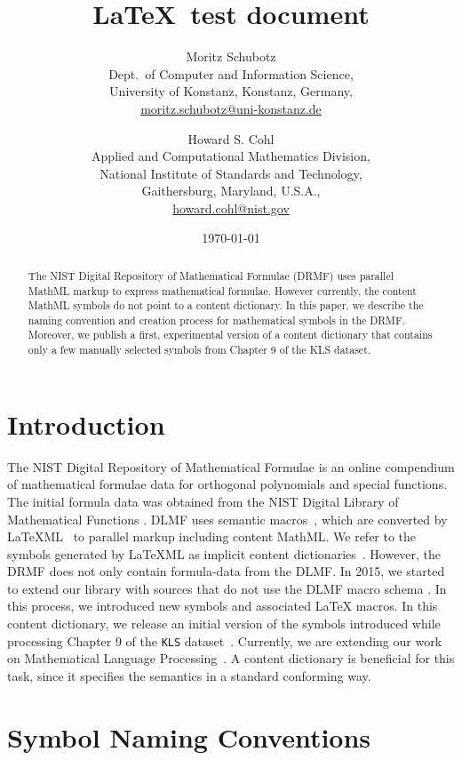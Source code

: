 \documentclass[]{article}
\title{\LaTeX~test document}
\author{
  Moritz Schubotz\\
  Dept.~of Computer and Information Science,\\
  University of Konstanz, Konstanz, Germany,\\
\url{moritz.schubotz@uni-konstanz.de}\\[0.2cm]
\and
  Howard S. Cohl\\
  Applied and Computational Mathematics Division,\\
  National Institute of Standards and Technology,\\
  Gaithersburg, Maryland, U.S.A.,\\
\url{howard.cohl@nist.gov}
}
\date{\today}
\newcommand{\MathML}{MathML}
\newcommand{\LaTeXML}{\LaTeX ML}
\begin{document}
    \maketitle

    \begin{abstract}
  The NIST Digital Repository of Mathematical Formulae (DRMF) uses 
  parallel MathML markup to express mathematical formulae. However 
  currently, the content MathML symbols do not point to a content 
  dictionary. In this paper, we describe the naming convention and 
  creation process for mathematical symbols in the DRMF. Moreover, we 
  publish a first, experimental version of a content dictionary that 
  contains only a few manually selected symbols from Chapter 9 of 
  the KLS dataset.
\end{abstract}

    \section{Introduction}

The NIST Digital Repository of Mathematical Formulae \cite{disCicm14Drmf} is an online compendium of mathematical formulae data for orthogonal polynomials 
and special functions.
The initial formula data was obtained from the NIST Digital Library of Mathematical Functions \cite{dlmf}.
DLMF uses semantic macros~\cite{miller16}, which are converted by \LaTeXML~\cite{Miller} to parallel markup including content \MathML.
We refer to the symbols generated by \LaTeXML{} as implicit content dictionaries~\cite{schubotz16implCd}.
However, the DRMF does not only contain formula-data from the DLMF.
In 2015, we started to extend our library with sources that do not use the DLMF macro schema \cite{disCicm15}.
In this process, we introduced new symbols and associated \LaTeX{} macros.
In this content dictionary, we release an initial version of the symbols introduced while processing Chapter 9 %
of the {\tt KLS} dataset~\cite{Koekoeketal}.
Currently, we are extending our work on Mathematical Language Processing~\cite{disSigir16,Cohl17}.
A content dictionary is beneficial for this task, since it specifies the semantics in a standard conforming way.

\section{Symbol Naming Conventions}\label{sc.nc}
\end{document}
